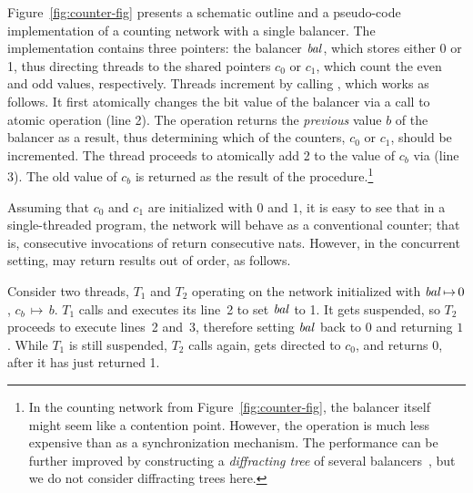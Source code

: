 Figure~\ref{fig:counter-fig} presents a schematic outline and a
pseudo-code implementation of a counting network with a single
balancer.
%
The implementation contains three pointers: the balancer $\mathit{bal}$, which
stores either 0 or 1, thus directing threads to the shared pointers
$c_0$ or $c_1$, which count the even and odd values,
respectively. Threads increment by calling , which
works as follows. It first atomically changes the bit value of the
balancer via a call to atomic operation  (line 2). The
 operation returns the \emph{previous} value $b$ of the
balancer as a result, thus determining which of the counters, $c_0$ or
$c_1$, should be incremented. The thread proceeds to atomically add 2
to the value of $c_b$ via  (line 3). The old value
of $c_b$ is returned as the result of the procedure.\footnote{In the
  counting network from Figure~\ref{fig:counter-fig}, the balancer
  itself might seem like a contention point. However, the 
  operation is much less expensive than  as a
  synchronization mechanism. The performance can be further improved
  by constructing a \emph{diffracting tree} of several
  balancers~\cite[\S 12.6]{Herlihy-Shavit:08}, but we do not consider
  diffracting trees here.}

Assuming that $c_0$ and $c_1$ are initialized with $0$ and $1$, it is
easy to see that in a single-threaded program, the network will behave
as a conventional counter; that is, consecutive invocations of
 return consecutive nats.
%
However, in the concurrent setting,  may return
results out of order, as follows. 
%

\vspace{3pt}
\begin{example}
\label{ex:t1t2}
%
Consider two threads, $T_1$ and $T_2$ operating on the network
initialized with $\mathit{bal}\,{\mapsto}\,0$, $c_b\,{\mapsto}\,b$. $T_1$
calls  and executes its line~2 to set $\mathit{bal}$ to 1. It
gets suspended, so $T_2$ proceeds to execute lines~2 and~3, therefore
setting $\mathit{bal}$ back to $0$ and returning $1$. While $T_1$ is still
suspended, $T_2$ calls  again, gets directed to $c_0$,
and returns 0, after it has just returned 1.
%
\end{example}
\vspace{3pt}


